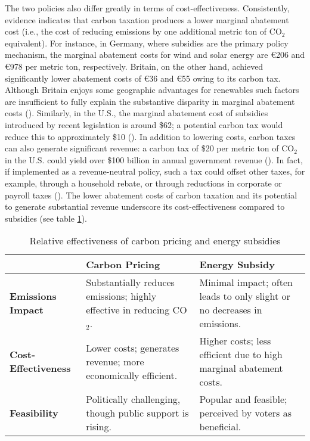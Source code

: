 \documentclass[12pt, a4paper, twoside]{article}
\begin{document}
The two policies also differ greatly in terms of cost-effectiveness. Consistently, evidence indicates that carbon taxation produces a lower marginal abatement cost (i.e., the cost of reducing emissions by one additional metric ton of CO$_2$ equivalent). For instance, in Germany, where subsidies are the primary policy mechanism, the marginal abatement costs for wind and solar energy are €206 and €978 per metric ton, respectively. Britain, on the other hand, achieved significantly lower abatement costs of €36 and €55 owing to its carbon tax. Although Britain enjoys some geographic advantages for renewables such factors are insufficient to fully explain the substantive disparity in marginal abatement costs (\cite[p.\ 5]{gugler2021effectiveness}). Similarly, in the U.S., the marginal abatement cost of subsidies introduced by recent legislation is around \$62; a potential carbon tax would reduce this to approximately \$10 (\cite[pp.\ 3, 48]{bistline2023economic}). In addition to lowering costs, carbon taxes can also generate significant revenue: a carbon tax of \$20 per metric ton of CO$_2$ in the U.S. could yield over \$100 billion in annual government revenue (\cite[p.\ 156]{aldy2012promise}). In fact, if implemented as a revenue-neutral policy, such a tax could offset other taxes, for example, through a household rebate, or through reductions in corporate or payroll taxes (\cite{marshall2018fast}). The lower abatement costs of carbon taxation and its potential to generate substantial revenue underscore its cost-effectiveness compared to subsidies (see table \ref{tab:1}). 

\begin{table}[h]
\centering
\begin{tabular}{|p{3cm}|p{5cm}|p{5cm}|}
\hline
& \textbf{Carbon Pricing} & \textbf{Energy Subsidy} \\ \hline
\textbf{Emissions Impact} & Substantially reduces emissions; highly effective in reducing CO$_2$. & Minimal impact; often leads to only slight or no decreases in emissions. \\ \hline
\textbf{Cost-Effectiveness} & Lower costs; generates revenue; more economically efficient. & Higher costs; less efficient due to high marginal abatement costs. \\ \hline
\textbf{Feasibility} & Politically challenging, though public support is rising. & Popular and feasible; perceived by voters as beneficial. \\ \hline
\end{tabular}
\caption{Relative effectiveness of carbon pricing and energy subsidies}
\label{tab:1}
\end{table}
\end{document}
